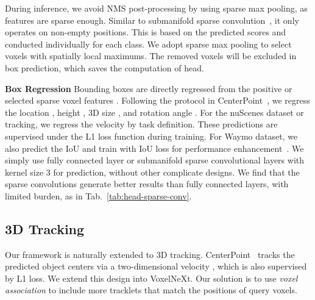 \documentclass[10pt,twocolumn,letterpaper]{article}
\begin{document}
{\begin{table}[t]
\begin{center}
\begin{tabular}{|l|cccccc|}
\end{tabular}
\label{tab:nuscenes-sprs-ratio-ablation}
\end{center}
\end{table}
\begin{table}[t]
\begin{center}
\caption{Effects of spatial pruning on various layers. We use it on the first 3 down-sampling layers by default.}
\label{tab:voxel-pruning-layers}
\end{center}
\end{table}

During inference, we avoid NMS post-processing by using sparse max pooling, as features are sparse enough. Similar to submanifold sparse convolution~\cite{submanifold-sparse-conv-v2}, it only operates on non-empty positions. This is based on the predicted scores  and conducted individually for each class. We adopt sparse max pooling to select voxels with spatially local maximums.  The removed voxels will be excluded in box prediction, which saves the computation of head.

\vspace{0.5em}
\noindent
\textbf{Box Regression}
Bounding boxes are directly regressed from the positive or selected sparse voxel features . Following the protocol in CenterPoint~\cite{centerpoint}, we regress the location , height , 3D size , and rotation angle . For the nuScenes dataset or tracking, we regress the velocity  by task definition. These predictions are supervised under the L1 loss function during training. For Waymo dataset, we also predict the IoU and train with IoU loss for performance enhancement~\cite{afdetv2}. We simply use fully connected layer or  submanifold sparse convolutional layers with kernel size 3 for prediction, without other complicate designs. We find that the  sparse convolutions generate better results than fully connected layers, with limited burden, as in Tab.~\ref{tab:head-sparse-conv}.

\subsection{3D Tracking}
\label{sec:3d-tracking}
Our framework is naturally extended to 3D tracking. CenterPoint~\cite{centerpoint} tracks the predicted object centers via a two-dimensional velocity , which is also supervised by L1 loss. We extend this design into VoxelNeXt. Our solution is to use {\em voxel association} to include more tracklets that match the positions of query voxels.

}
\end{document}

